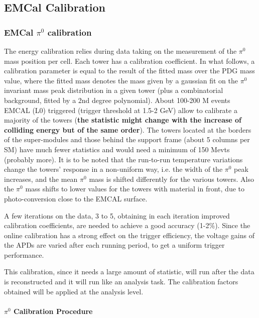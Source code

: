 \subsection{EMCal Calibration}

\subsubsection{EMCal $\pi^{0}$ calibration}
The energy calibration relies during data taking on the measurement of the $\pi^{0}$ mass position per cell. Each tower has a calibration coefficient. In what follows, a calibration parameter is equal to the result of the fitted mass over the PDG mass value, where the fitted mass denotes the mass given by a gaussian fit on the $\pi^{0}$ invariant mass peak distribution in a given tower (plus a combinatorial background, fitted by a 2nd degree polynomial).
About 100-200 M events EMCAL (L0) triggered (trigger threshold at 1.5-2 GeV) allow to calibrate a majority of the towers ({\bf the statistic might change with the increase of colliding energy but of the same order}). The towers located at the borders of the super-modules and those  behind the support frame (about 5 columns per SM) have much fewer statistics and would need a minimum of 150 Mevts (probably more). It is to be noted that the run-to-run temperature variations change the towers' response in a non-uniform way, i.e. the width of the $\pi^{0}$ peak increases, and the mean $\pi^{0}$ mass is shifted differently for the various towers. Also the $\pi^{0}$ mass shifts to lower values for the towers with material in front, due to photo-conversion close to the EMCAL surface.

A few iterations on the data, 3 to 5, obtaining in each iteration improved calibration coefficients, are needed to achieve a good accuracy (1-2\%). Since the online calibration has a strong effect on the trigger efficiency, the voltage gains of the APDs are varied after each running period, to get a uniform trigger performance. 

This calibration, since it needs a large amount of statistic, will run after the data is reconstructed and it will run like an analysis task. The calibration factors obtained will be applied at the analysis level.

\paragraph*{$\pi^{0}$ Calibration Procedure\\}


